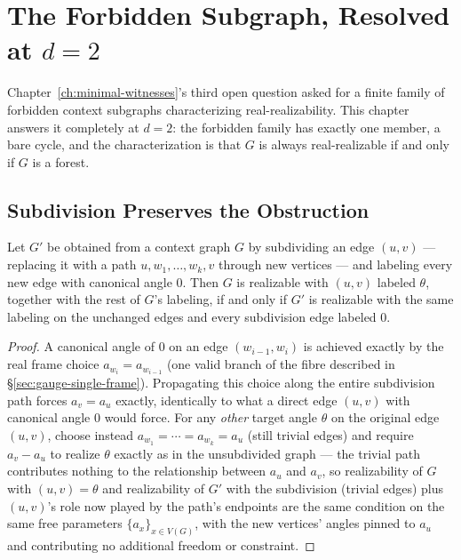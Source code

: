 \chapter{The Forbidden Subgraph, Resolved at \texorpdfstring{$d=2$}{d=2}}
\label{ch:forbidden-subgraph}

Chapter~\ref{ch:minimal-witnesses}'s third open question asked for a finite
family of forbidden context subgraphs characterizing real-realizability.
This chapter answers it completely at $d=2$: the forbidden family has
exactly one member, a bare cycle, and the characterization is that $G$ is
always real-realizable if and only if $G$ is a forest.

\section{Subdivision Preserves the Obstruction}

\begin{lemma}
\label{lem:subdivision}
Let $G'$ be obtained from a context graph $G$ by subdividing an edge
$(u,v)$ — replacing it with a path $u,w_1,\dots,w_k,v$ through new
vertices — and labeling every new edge with canonical angle $0$. Then $G$
is realizable with $(u,v)$ labeled $\theta$, together with the rest of
$G$'s labeling, if and only if $G'$ is realizable with the same labeling
on the unchanged edges and every subdivision edge labeled $0$.
\end{lemma}

\begin{proof}
A canonical angle of $0$ on an edge $(w_{i-1},w_i)$ is achieved exactly by
the real frame choice $a_{w_i} = a_{w_{i-1}}$ (one valid branch of the
fibre described in \S\ref{sec:gauge-single-frame}). Propagating this
choice along the entire subdivision path forces $a_v = a_u$ exactly,
identically to what a direct edge $(u,v)$ with canonical angle $0$ would
force. For any \emph{other} target angle $\theta$ on the original edge
$(u,v)$, choose instead $a_{w_1}=\cdots=a_{w_k}=a_u$ (still trivial edges)
and require $a_v - a_u$ to realize $\theta$ exactly as in the unsubdivided
graph — the trivial path contributes nothing to the relationship between
$a_u$ and $a_v$, so realizability of $G$ with $(u,v)=\theta$ and
realizability of $G'$ with the subdivision (trivial edges) plus $(u,v)$'s
role now played by the path's endpoints are the same condition on the same
free parameters $\{a_x\}_{x\in V(G)}$, with the new vertices'
angles pinned to $a_u$ and contributing no additional freedom or
constraint.
\end{proof}

